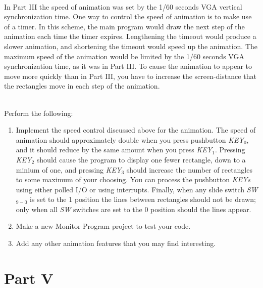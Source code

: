 \documentclass[epsfig,10pt,fullpage]{article}
\begin{document}
~\\
\noindent
In Part III the speed of animation was set by the 1/60 seconds VGA vertical synchronization time.
One way to control the speed of animation is to make use of a timer. In this scheme, the main 
program would draw the next step of the animation each time the timer expires.  Lengthening 
the timeout would produce a slower animation, and shortening the timeout would speed up the 
animation. The maximum speed 
of the animation would be limited by the 1/60 seconds VGA synchronization time, as it was in 
Part III.  To cause the animation to appear to move more quickly than in Part III, you
have to increase the screen-distance that the rectangles move in each step of the animation.

~\\
\noindent
Perform the following:

\begin{enumerate}

\item Implement the speed control discussed above for the animation. The speed of animation 
should approximately double when you press pushbutton {\it KEY}$_0$, and it should reduce by 
the same amount when you press {\it KEY}$_1$. Pressing {\it KEY}$_2$ should cause the
program to display one fewer rectangle, down to a minium of one, and pressing {\it KEY}$_3$
should increase the number of rectangles to some maximum of your choosing. You can process
the pushbutton {\it KEYs} using either polled I/O or using interrupts. Finally, when
any slide switch {\it SW}$_{9-0}$ is set to the 1 position the lines between rectangles should 
not be drawn; only when all {\it SW} switches are set to the 0 position should the lines appear.

\item Make a new Monitor Program project to test your code.

\item Add any other animation features that you may find interesting.
\end{enumerate}

\section*{Part V}
\end{document}

